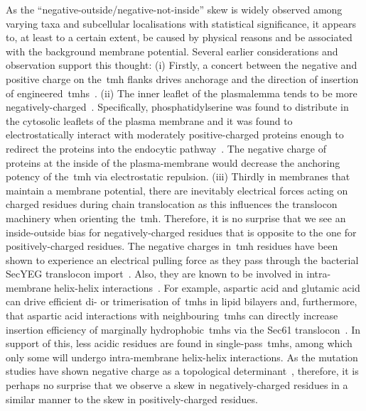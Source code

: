 As the ``negative-outside/negative-not-inside'' skew is widely observed among varying taxa and subcellular localisations with statistical significance, it appears to, at least to a certain extent, be caused by physical reasons and be associated with the background membrane potential.
Several earlier considerations and observation support this thought: (i) Firstly, a concert between the negative and positive charge on the~\gls{tmh} flanks drives anchorage and the direction of insertion of engineered~\gls{tmh}s~\cite{Sipos1993, Hartmann1989}.
(ii) The inner leaflet of the plasmalemma tends to be more negatively\--charged~\cite{Zachowski1993}.
Specifically, phosphatidylserine was found to distribute in the cytosolic leaflets of the plasma membrane and it was found to electrostatically interact with moderately positive-charged proteins enough to redirect the proteins into the endocytic pathway~\cite{Yeung2008}.
The negative charge of proteins at the inside of the plasma-membrane would decrease the anchoring potency of the~\gls{tmh} via electrostatic repulsion.
(iii) Thirdly in membranes that maintain a membrane potential, there are inevitably electrical forces acting on charged residues during chain translocation as this influences the translocon machinery when orienting the~\gls{tmh}.
Therefore, it is no surprise that we see an inside-outside bias for negatively\--charged residues that is opposite to the one for positively\--charged residues.
The negative charges in~\gls{tmh} residues have been shown to experience an electrical pulling force as they pass through the bacterial SecYEG translocon import~\cite{Ismail2012, Ismail2015}.
Also, they are known to be involved in intra-membrane helix-helix interactions~\cite{Meindl-Beinker2006}.
For example, aspartic acid and glutamic acid can drive efficient di- or trimerisation of~\gls{tmh}s in lipid bilayers and, furthermore, that aspartic acid interactions with neighbouring~\gls{tmh}s can directly increase insertion efficiency of marginally hydrophobic~\gls{tmh}s via the Sec61 translocon~\cite{Meindl-Beinker2006}.
In support of this, less acidic residues are found in single\--pass~\gls{tmh}s, among which only some will undergo intra-membrane helix-helix interactions.
As the mutation studies have shown negative charge as a topological determinant~\cite{Nilsson1990}, therefore, it is perhaps no surprise that we observe a skew in negatively\--charged residues in a similar manner to the skew in positively\--charged residues.

